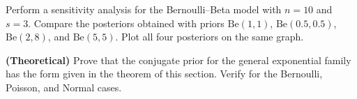 \begin{exercise}
Perform a sensitivity analysis for the Bernoulli--Beta model with
$n = 10$ and $s = 3$. Compare the posteriors obtained with priors
$\text{Be}(1,1)$, $\text{Be}(0.5, 0.5)$, $\text{Be}(2, 8)$, and
$\text{Be}(5, 5)$. Plot all four posteriors on the same graph.
\end{exercise}

\begin{exercise}
\textbf{(Theoretical)} Prove that the conjugate prior for the general
exponential family has the form given in the theorem of this section.
Verify for the Bernoulli, Poisson, and Normal cases.
\end{exercise}
